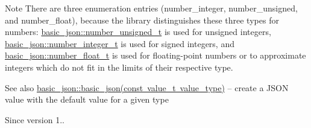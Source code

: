 \begin{DoxyNote}{Note}
There are three enumeration entries (number\+\_\+integer, number\+\_\+unsigned, and number\+\_\+float), because the library distinguishes these three types for numbers\+: \mbox{\hyperlink{classnlohmann_1_1basic__json_ab906e29b5d83ac162e823ada2156b989}{basic\+\_\+json\+::number\+\_\+unsigned\+\_\+t}} is used for unsigned integers, \mbox{\hyperlink{classnlohmann_1_1basic__json_a98e611d67b7bd75307de99c9358ab2dc}{basic\+\_\+json\+::number\+\_\+integer\+\_\+t}} is used for signed integers, and \mbox{\hyperlink{classnlohmann_1_1basic__json_a88d6103cb3620410b35200ee8e313d97}{basic\+\_\+json\+::number\+\_\+float\+\_\+t}} is used for floating-\/point numbers or to approximate integers which do not fit in the limits of their respective type.
\end{DoxyNote}
\begin{DoxySeeAlso}{See also}
\mbox{\hyperlink{classnlohmann_1_1basic__json_aed115142bd0c6c66c864700e0467df55}{basic\+\_\+json\+::basic\+\_\+json(const value\+\_\+t value\+\_\+type)}} -- create a J\+S\+ON value with the default value for a given type
\end{DoxySeeAlso}
\begin{DoxySince}{Since}
version 1.. 
\end{DoxySince}
